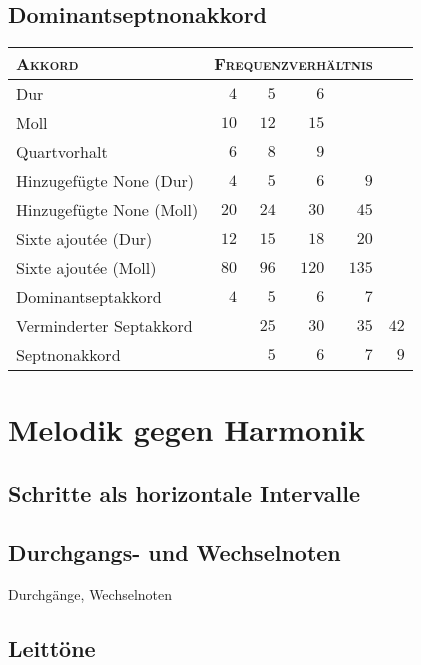 \documentclass[ngerman,11pt]{scrartcl}
\begin{document}
\subsection{Dominantseptnonakkord}

\begin{table}
	\centering
	\begin{tabular}{lrrrrr}
		\toprule
		\textsc{Akkord} & \multicolumn{4}{l}{\textsc{Frequenzverhältnis}}\\
		\midrule
		Dur                         & $4$  & $5$  & $6$\\
		Moll                        & $10$ & $12$ & $15$\\
		Quartvorhalt                & $6$  & $8$  & $9$\\
		Hinzugefügte None (Dur)     & $4$  & $5$  & $6$  & $9$\\
		Hinzugefügte None (Moll)    & $20$ & $24$ & $30$ & $45$\\
		Sixte ajoutée (Dur)         & $12$ & $15$ & $18$ & $20$\\
		Sixte ajoutée (Moll)        & $80$ & $96$ & $120$ & $135$\\
		Dominantseptakkord          & $4$  & $5$  & $6$  & $7$\\
		Verminderter Septakkord     &      & $25$ & $30$ & $35$ & $42$\\
		Septnonakkord               &      & $5$  & $6$  & $7$  & $9$\\
		\bottomrule
	\end{tabular}
\end{table}

\section{Melodik gegen Harmonik}

\subsection{Schritte als horizontale Intervalle}

\subsection{Durchgangs- und Wechselnoten}

Durchgänge, Wechselnoten

\subsection{Leittöne}
\label{sec:ln}
\end{document}
